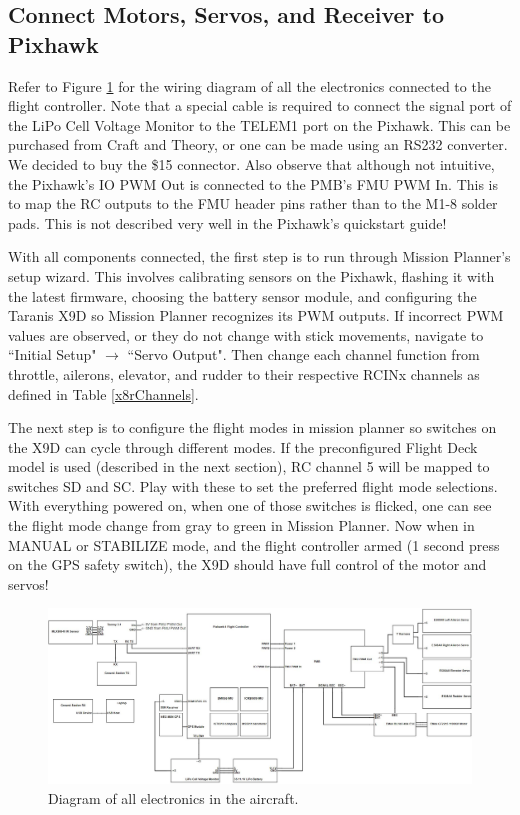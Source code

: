 \documentclass[12pt,journal,compsoc]{IEEEtran}
\begin{document}
\subsection{Connect Motors, Servos, and Receiver to Pixhawk}
Refer to Figure \ref{mainScheme} for the wiring diagram of all the electronics connected to the flight controller. Note that a special cable is required to connect the signal port of the LiPo Cell Voltage Monitor to the TELEM1 port on the Pixhawk. This can be purchased from Craft and Theory, or one can be made using an RS232 converter. We decided to buy the \$15 connector. Also observe that although not intuitive, the Pixhawk's IO PWM Out is connected to the PMB's FMU PWM In. This is to map the RC outputs to the FMU header pins rather than to the M1-8 solder pads. This is not described very well in the Pixhawk's quickstart guide!

With all components connected, the first step is to run through Mission Planner's setup wizard. This involves calibrating sensors on the Pixhawk, flashing it with the latest firmware, choosing the battery sensor module, and configuring the Taranis X9D so Mission Planner recognizes its PWM outputs. If incorrect PWM values are observed, or they do not change with stick movements, navigate to ``Initial Setup" $\rightarrow$ ``Servo Output". Then change each channel function from throttle, ailerons, elevator, and rudder to their respective RCINx channels as defined in Table \ref{x8rChannels}.

The next step is to configure the flight modes in mission planner so switches on the X9D can cycle through different modes. If the preconfigured Flight Deck model is used (described in the next section), RC channel 5 will be mapped to switches SD and SC. Play with these to set the preferred flight mode selections. With everything powered on, when one of those switches is flicked, one can see the flight mode change from gray to green in Mission Planner. Now when in MANUAL or STABILIZE mode, and the flight controller armed (1 second press on the GPS safety switch), the X9D should have full control of the motor and servos!\\

\begin{figure}[h]
\hspace*{0cm}
\centering
\includegraphics[width=\textwidth]{hardwareBlockDiagram.jpg}
\caption{Diagram of all electronics in the aircraft.}
\label{mainScheme}
\end{figure}
\end{document}
